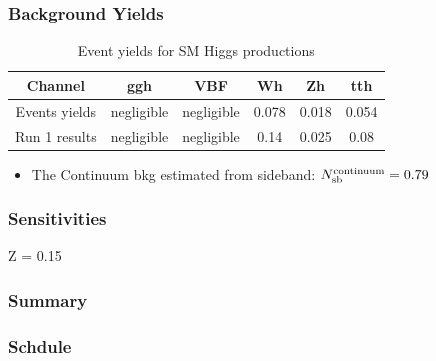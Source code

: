 \documentclass[preprint,review,16px]{beamer}
\begin{document}
\begin{frame}
\vspace{3mm}
\frametitle{Background Yields}

\begin{table}[tb]
\scriptsize
\begin{tabular}{c|ccccc}
\hline
Channel   &ggh         &VBF         &Wh       &Zh        &tth  \\
\hline
Events yields    &negligible  &negligible  &0.078    &0.018     &0.054\\
Run 1 results    &negligible  &negligible  &0.14     &0.025     &0.08 \\
\hline
\end{tabular}
\caption{Event yields for SM Higgs productions}
\label{tab:bkg-yields}
\end{table}

\begin{itemize}
  \item The Continuum bkg estimated from sideband:
  $N^{\textup{continuum}}_{\textup{sb}} = 0.79$
\end{itemize}

\vspace{3mm}
\end{frame}

\begin{frame}%
\vspace{3mm}
\frametitle{Sensitivities}

Z = 0.15

\vspace{3mm}
\end{frame}


\begin{frame}%
\vspace{3mm}
\frametitle{Summary}

\vspace{3mm}
\end{frame}


\begin{frame}%
\vspace{3mm}
\frametitle{Schdule}

\vspace{3mm}
\end{frame}
\end{document}
